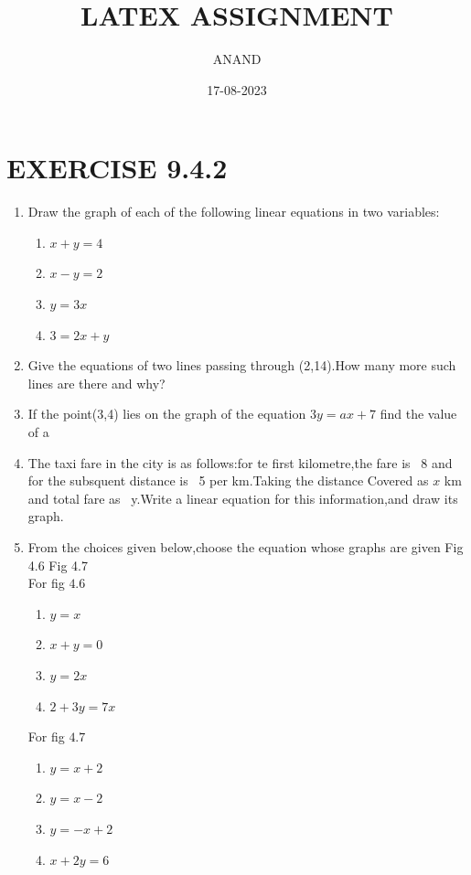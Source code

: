 \documentclass[10pt]{article}
\begin{document}
\title{LATEX ASSIGNMENT}
\author{ANAND}
\date{17-08-2023}
\maketitle
\section*{EXERCISE 9.4.2}
\begin{enumerate}[label=\arabic*.,ref=\theenumi]
\item Draw the graph of each of the following linear equations in two variables:
\begin{enumerate}[label=(\roman*),ref=\theenumi]
\item $x+y=4$
\item $x-y=2$
\item $y=3x$
\item $3=2x+y$
\end{enumerate}
\item Give the equations of two lines passing through (2,14).How many more such lines are there and 
why?
\item If the point(3,4) lies on the graph of the equation $3y=ax+7$ find the value of a
\item The taxi fare in the city is as follows:for te first kilometre,the fare is \rupee~8 and for the 
subsquent distance is \rupee~5 per km.Taking the distance Covered as $x$ km and total fare as
\rupee~y.Write a linear equation for this information,and draw its graph.
\item From the choices given below,choose the equation whose graphs are given Fig 4.6 Fig 4.7
\\
For fig $4.6$ 
\begin{enumerate}[label=(\roman*)]
\item $y=x$
\item $x+y=0$
\item $y=2x$
\item $2+3y=7x$
\end{enumerate} 
For fig $4.7$
            \begin{enumerate}[label=(\roman*)]
\item $y=x+2$
\item $y=x-2$
\item $y=-x+2$
\item $x+2y=6$
\end{enumerate}
\begin{figure}[ht]

\end{figure}
\end{enumerate}
\end{document}
